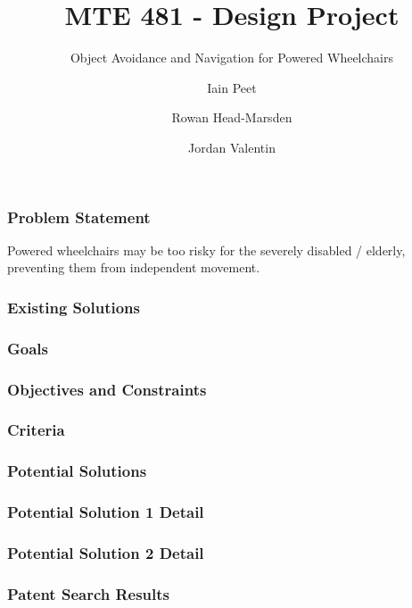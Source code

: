\documentclass{beamer}
\title{MTE 481 - Design Project}
\subtitle{Object Avoidance and Navigation for Powered Wheelchairs}
\author{Iain Peet \and Rowan Head-Marsden \and Jordan Valentin}
\begin{document}
\begin{frame}
 \titlepage
\end{frame}

\begin{frame}
 \frametitle{Problem Statement}
 Powered wheelchairs may be too risky for the severely disabled / elderly,
 preventing them from independent movement.
\end{frame}

\begin{frame}
 \frametitle{Existing Solutions}
\end{frame}

\begin{frame}
 \frametitle{Goals}
\end{frame}

\begin{frame}
 \frametitle{Objectives and Constraints}
\end{frame}

\begin{frame}
 \frametitle{Criteria}
\end{frame}

\begin{frame}
 \frametitle{Potential Solutions}
\end{frame}

\begin{frame}
 \frametitle{Potential Solution 1 Detail}
\end{frame}

\begin{frame}
 \frametitle{Potential Solution 2 Detail}
\end{frame}

\begin{frame}
 \frametitle{Patent Search Results}
\end{frame}
\end{document}
